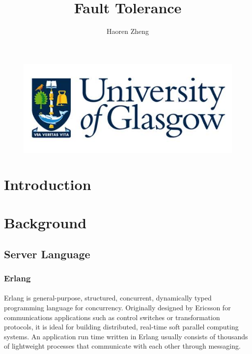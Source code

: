 \documentclass{article}
\title{Fault Tolerance}
\author{Haoren Zheng}
\begin{document}
\begin{titlepage}
\begin{figure}[ht]
\includegraphics[scale=1]{Title.JPG}
\maketitle
\end{figure}
\end{titlepage}
\begin{abstract}
\end{abstract}
\tableofcontents
\section{Introduction}\vspace{24pt}
\section{Background}\vspace{24pt}
\subsection{Server Language}\vspace{18pt}
\subsubsection{Erlang}\vspace{16pt}
\paragraph{}\vspace{11pt}\justifying
Erlang is general-purpose, structured, concurrent, dynamically typed programming language for concurrency\cite{}. Originally designed by Ericsson for communications applications such as control switches or transformation protocols, it is ideal for building distributed, real-time soft parallel computing systems. An application run time written in Erlang usually consists of thousands of lightweight processes that communicate with each other through messaging.\\
\end{document}
